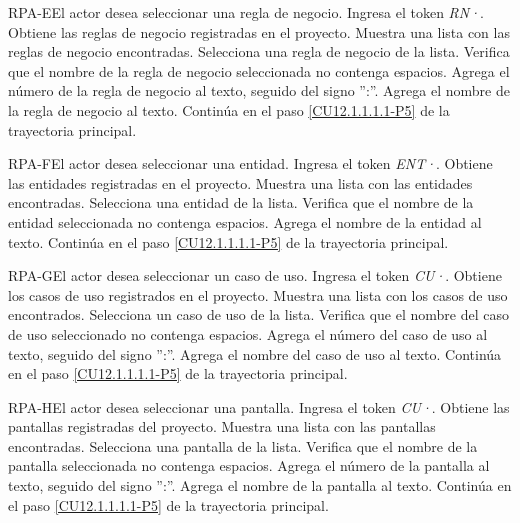 	\begin{UCtrayectoriaA}{RPA-E}{El actor desea seleccionar una regla de negocio.}
		\UCpaso[\UCactor] Ingresa el token {\em RN·}. 
		\UCpaso[\UCsist] Obtiene las reglas de negocio registradas en el proyecto.
		\UCpaso[\UCsist] Muestra una lista con las reglas de negocio encontradas.
		\UCpaso[\UCactor] Selecciona una regla de negocio de la lista.
		\UCpaso[\UCsist] Verifica que el nombre de la regla de negocio seleccionada no contenga espacios. 
		\UCpaso[\UCsist] Agrega el número de la regla de negocio al texto, seguido del signo '':''.
		\UCpaso[\UCsist] Agrega el nombre de la regla de negocio al texto.
		\UCpaso Continúa en el paso \ref{CU12.1.1.1.1-P5} de la trayectoria principal.
	\end{UCtrayectoriaA}

	\begin{UCtrayectoriaA}{RPA-F}{El actor desea seleccionar una entidad.}
		\UCpaso[\UCactor] Ingresa el token {\em ENT·}. 
		\UCpaso[\UCsist] Obtiene las entidades registradas en el proyecto.
		\UCpaso[\UCsist] Muestra una lista con las entidades encontradas.
		\UCpaso[\UCactor] Selecciona una entidad de la lista.
		\UCpaso[\UCsist] Verifica que el nombre de la entidad seleccionada no contenga espacios. 
		\UCpaso[\UCsist] Agrega el nombre de la entidad al texto.
		\UCpaso Continúa en el paso \ref{CU12.1.1.1.1-P5} de la trayectoria principal.
	\end{UCtrayectoriaA}

	\begin{UCtrayectoriaA}{RPA-G}{El actor desea seleccionar un caso de uso.}
		\UCpaso[\UCactor] Ingresa el token {\em CU·}. 
		\UCpaso[\UCsist] Obtiene los casos de uso registrados en el proyecto.
		\UCpaso[\UCsist] Muestra una lista con los casos de uso encontrados.
		\UCpaso[\UCactor] Selecciona un caso de uso de la lista.
		\UCpaso[\UCsist] Verifica que el nombre del caso de uso seleccionado no contenga espacios. 
		\UCpaso[\UCsist] Agrega el número del caso de uso al texto, seguido del signo '':''.
		\UCpaso[\UCsist] Agrega el nombre del caso de uso al texto.
		\UCpaso Continúa en el paso \ref{CU12.1.1.1.1-P5} de la trayectoria principal.
	\end{UCtrayectoriaA}

	\begin{UCtrayectoriaA}{RPA-H}{El actor desea seleccionar una pantalla.}
		\UCpaso[\UCactor] Ingresa el token {\em CU·}. 
		\UCpaso[\UCsist] Obtiene las pantallas registradas del proyecto.
		\UCpaso[\UCsist] Muestra una lista con las pantallas encontradas.
		\UCpaso[\UCactor] Selecciona una pantalla de la lista.
		\UCpaso[\UCsist] Verifica que el nombre de la pantalla seleccionada no contenga espacios. 
		\UCpaso[\UCsist] Agrega el número de la pantalla al texto, seguido del signo '':''.
		\UCpaso[\UCsist] Agrega el nombre de la pantalla al texto.
		\UCpaso Continúa en el paso \ref{CU12.1.1.1.1-P5} de la trayectoria principal.
	\end{UCtrayectoriaA}

